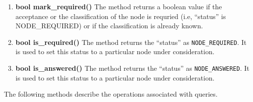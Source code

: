 \begin{enumerate}
\item \textbf{bool mark\_required()} \hfill \vskip 1pt
	The method returns a boolean value \true if the acceptance or the classification of the node is requried (i.e, ``status'' is NODE\_REQUIRED) or \false if the classification is already known.
	
\item \textbf{bool is\_required()} \hfill \vskip 1pt
	The method returns the ``status'' as \texttt{NODE\_REQUIRED}. It is used to set this status to a particular node under consideration.

\item \textbf{bool is\_answered()} \hfill \vskip 1pt
	The method returns the ``status'' as \texttt{NODE\_ANSWERED}. It is used to set this status to a particular node under consideration.
\end{enumerate}

\vskip 1pt
  The following methods describe the operations associated with queries.

